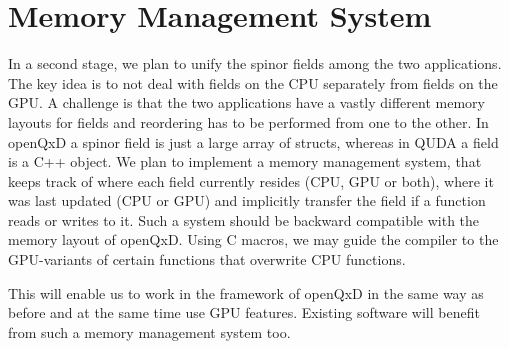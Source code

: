 \chapter{Memory Management System}
\label{ch:p1:memory}

In a second stage, we plan to unify the spinor fields among the two applications. The key idea is to not deal with fields on the CPU separately from fields on the GPU. A challenge is that the two applications have a vastly different memory layouts for fields and reordering has to be performed from one to the other. In openQxD a spinor field is just a large array of structs, whereas in QUDA a field is a C++ object. We plan to implement a memory management system, that keeps track of where each field currently resides (CPU, GPU or both), where it was last updated (CPU or GPU) and implicitly transfer the field if a function reads or writes to it. Such a system should be backward compatible with the memory layout of openQxD. Using C macros, we may guide the compiler to the GPU-variants of certain functions that overwrite CPU functions.

This will enable us to work in the framework of openQxD in the same way as before and at the same time use GPU features. 
Existing software will benefit from such a memory management system too.

